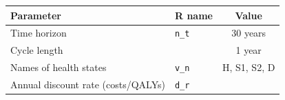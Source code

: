 \documentclass[]{article}
\begin{document}
\begin{longtable}[]{@{}llc@{}}
\toprule
\begin{minipage}[b]{0.47\columnwidth}\raggedright\strut
\textbf{Parameter}\strut
\end{minipage} & \begin{minipage}[b]{0.18\columnwidth}\raggedright\strut
\textbf{R name}\strut
\end{minipage} & \begin{minipage}[b]{0.20\columnwidth}\centering\strut
\textbf{Value}\strut
\end{minipage}\tabularnewline
\midrule
\endhead
\begin{minipage}[t]{0.47\columnwidth}\raggedright\strut
Time horizon\strut
\end{minipage} & \begin{minipage}[t]{0.18\columnwidth}\raggedright\strut
\texttt{n\_t}\strut
\end{minipage} & \begin{minipage}[t]{0.20\columnwidth}\centering\strut
30 years\strut
\end{minipage}\tabularnewline
\begin{minipage}[t]{0.47\columnwidth}\raggedright\strut
Cycle length\strut
\end{minipage} & \begin{minipage}[t]{0.18\columnwidth}\raggedright\strut
\strut
\end{minipage} & \begin{minipage}[t]{0.20\columnwidth}\centering\strut
1 year\strut
\end{minipage}\tabularnewline
\begin{minipage}[t]{0.47\columnwidth}\raggedright\strut
Names of health states\strut
\end{minipage} & \begin{minipage}[t]{0.18\columnwidth}\raggedright\strut
\texttt{v\_n}\strut
\end{minipage} & \begin{minipage}[t]{0.20\columnwidth}\centering\strut
H, S1, S2, D\strut
\end{minipage}\tabularnewline
\begin{minipage}[t]{0.47\columnwidth}\raggedright\strut
Annual discount rate (costs/QALYs)\strut
\end{minipage} & \begin{minipage}[t]{0.18\columnwidth}\raggedright\strut
\texttt{d\_r}\strut
\end{minipage} & \begin{minipage}[t]{0.20\columnwidth}\centering\strut

\end{minipage}
\end{longtable}
\end{document}
